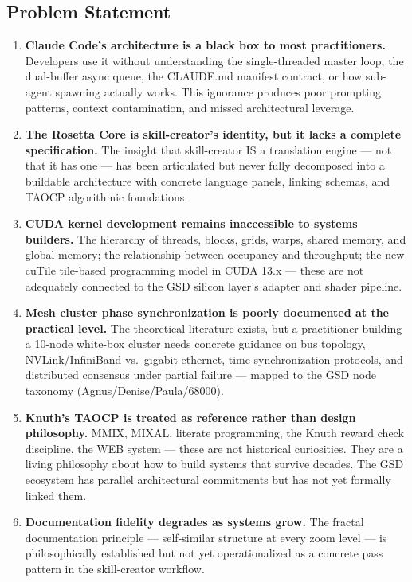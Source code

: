 \documentclass[11pt,letterpaper]{article}
\begin{document}
\subsection{Problem Statement}

\begin{enumerate}
  \item \textbf{Claude Code's architecture is a black box to most practitioners.} Developers use it without understanding the single-threaded master loop, the dual-buffer async queue, the CLAUDE.md manifest contract, or how sub-agent spawning actually works. This ignorance produces poor prompting patterns, context contamination, and missed architectural leverage.
  
  \item \textbf{The Rosetta Core is skill-creator's identity, but it lacks a complete specification.} The insight that skill-creator IS a translation engine --- not that it has one --- has been articulated but never fully decomposed into a buildable architecture with concrete language panels, linking schemas, and TAOCP algorithmic foundations.
  
  \item \textbf{CUDA kernel development remains inaccessible to systems builders.} The hierarchy of threads, blocks, grids, warps, shared memory, and global memory; the relationship between occupancy and throughput; the new cuTile tile-based programming model in CUDA 13.x --- these are not adequately connected to the GSD silicon layer's adapter and shader pipeline.
  
  \item \textbf{Mesh cluster phase synchronization is poorly documented at the practical level.} The theoretical literature exists, but a practitioner building a 10-node white-box cluster needs concrete guidance on bus topology, NVLink/InfiniBand vs.\ gigabit ethernet, time synchronization protocols, and distributed consensus under partial failure --- mapped to the GSD node taxonomy (Agnus/Denise/Paula/68000).
  
  \item \textbf{Knuth's TAOCP is treated as reference rather than design philosophy.} MMIX, MIXAL, literate programming, the Knuth reward check discipline, the WEB system --- these are not historical curiosities. They are a living philosophy about how to build systems that survive decades. The GSD ecosystem has parallel architectural commitments but has not yet formally linked them.
  
  \item \textbf{Documentation fidelity degrades as systems grow.} The fractal documentation principle --- self-similar structure at every zoom level --- is philosophically established but not yet operationalized as a concrete pass pattern in the skill-creator workflow.
\end{enumerate}
\end{document}
